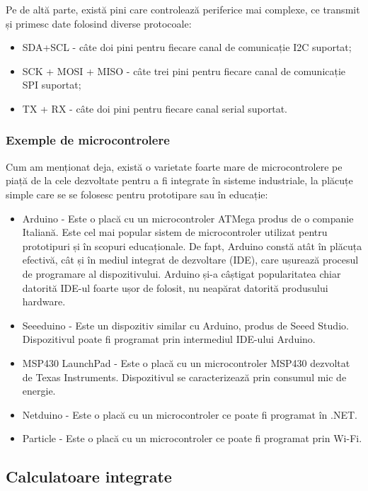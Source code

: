 Pe de altă parte, există pini care controlează periferice mai complexe, ce
transmit și primesc date folosind diverse protocoale:

\begin{itemize}
	\item SDA+SCL - câte doi pini pentru fiecare canal de comunicație I2C
		suportat;
	\item SCK + MOSI + MISO - câte trei pini pentru fiecare canal de
		comunicație SPI suportat;
	\item TX + RX - câte doi pini pentru fiecare canal serial suportat.
\end{itemize}

\subsubsection{Exemple de microcontrolere}
\label{sec:embed-ics-micro-ex}

Cum am menționat deja, există o varietate foarte mare de microcontrolere pe
piață de la cele dezvoltate pentru a fi integrate în sisteme industriale, la
plăcuțe simple care se se folosesc pentru prototipare sau în educație:

\begin{itemize}
	\item Arduino - Este o placă cu un microcontroler ATMega produs de o
		companie Italiană. Este cel mai popular sistem de microcontroler
		utilizat pentru prototipuri și în scopuri educaționale. De fapt,
		Arduino constă atât în plăcuța efectivă, cât și în mediul
		integrat de dezvoltare (IDE), care ușurează procesul de
		programare al dispozitivului. Arduino și-a câștigat
		popularitatea chiar datorită IDE-ul foarte ușor de folosit, nu
		neapărat datorită produsului hardware.
	\item Seeeduino - Este un dispozitiv similar cu Arduino, produs de Seeed
		Studio. Dispozitivul poate fi programat prin intermediul
		IDE-ului Arduino.
	\item MSP430 LaunchPad - Este o placă cu un microcontroler MSP430
		dezvoltat de Texas Instruments. Dispozitivul se caracterizează
		prin consumul mic de energie.
	\item Netduino - Este o placă cu un microcontroler ce poate fi programat
		în .NET.
	\item Particle - Este o placă cu un microcontroler ce poate fi programat
		prin Wi-Fi.
\end{itemize}

\subsection{Calculatoare integrate}
\label{sec:embed-ics-embed}


